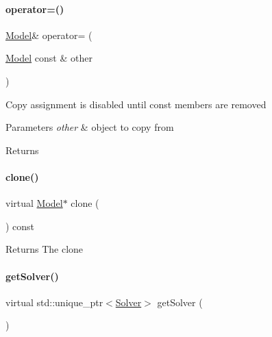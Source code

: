 \paragraph{\texorpdfstring{operator=()}{operator=()}}
{\footnotesize\ttfamily \mbox{\hyperlink{classamici_1_1_model}{Model}}\& operator= (\begin{DoxyParamCaption}\item[{\mbox{\hyperlink{classamici_1_1_model}{Model}} const \&}]{other }\end{DoxyParamCaption})\hspace{0.3cm}{\ttfamily [delete]}}

Copy assignment is disabled until const members are removed 
\begin{DoxyParams}{Parameters}
{\em other} & object to copy from \\
\hline
\end{DoxyParams}
\begin{DoxyReturn}{Returns}

\end{DoxyReturn}
\mbox{\label{classamici_1_1_model_a109f753bb5889d6563476826f5a3666d}} 
\paragraph{\texorpdfstring{clone()}{clone()}}
{\footnotesize\ttfamily virtual \mbox{\hyperlink{classamici_1_1_model}{Model}}$\ast$ clone (\begin{DoxyParamCaption}{ }\end{DoxyParamCaption}) const\hspace{0.3cm}{\ttfamily [pure virtual]}}

\begin{DoxyReturn}{Returns}
The clone 
\end{DoxyReturn}
\mbox{\label{classamici_1_1_model_a61d5b19b2e4d5ffcc73a014d59494344}} 
\paragraph{\texorpdfstring{get\+Solver()}{getSolver()}}
{\footnotesize\ttfamily virtual std\+::unique\+\_\+ptr$<$\mbox{\hyperlink{classamici_1_1_solver}{Solver}}$>$ get\+Solver (\begin{DoxyParamCaption}{ }\end{DoxyParamCaption})\hspace{0.3cm}{\ttfamily [pure virtual]}}

